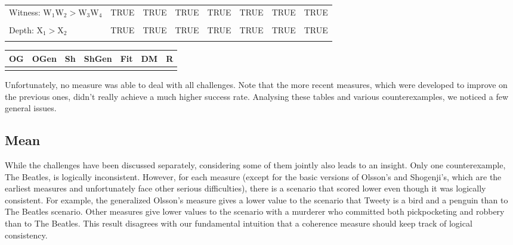 \documentclass[10pt,]{scrartcl}
\begin{document}
\begin{table}[H]
{\begin{tabular}{llllllll}
Witness: W$_1$W$_2>$W$_3$W$_4$ & TRUE & TRUE & TRUE & TRUE & TRUE & TRUE & TRUE\\
\cellcolor{gray!6}{Witness: W$_4$W$_5>$W$_3$W$_4$} & \cellcolor{gray!6}{TRUE} & \cellcolor{gray!6}{TRUE} & \cellcolor{gray!6}{TRUE} & \cellcolor{gray!6}{TRUE} & \cellcolor{gray!6}{TRUE} & \cellcolor{gray!6}{TRUE} & \cellcolor{gray!6}{TRUE}\\
Depth: X$_1>$X$_2$ & TRUE & TRUE & TRUE & TRUE & TRUE & TRUE & TRUE\\
\cellcolor{gray!6}{Dodecahedron:  Regular $=$  Dodecahedron} & \cellcolor{gray!6}{TRUE} & \cellcolor{gray!6}{TRUE} & \cellcolor{gray!6}{FALSE} & \cellcolor{gray!6}{FALSE} & \cellcolor{gray!6}{FALSE} & \cellcolor{gray!6}{FALSE} & \cellcolor{gray!6}{FALSE}\\
\bottomrule
\end{tabular}}
\end{table}

\begin{table}[H]
\centering
\begin{tabular}{rrrrrrr}
\toprule
OG & OGen & Sh & ShGen & Fit & DM & R\\
\midrule
\cellcolor{gray!6}{0.733} & \cellcolor{gray!6}{0.733} & \cellcolor{gray!6}{0.706} & \cellcolor{gray!6}{0.647} & \cellcolor{gray!6}{0.706} & \cellcolor{gray!6}{0.647} & \cellcolor{gray!6}{0.706}\\
\bottomrule
\end{tabular}
\end{table}

Unfortunately, no measure was able to deal with all challenges. Note
that the more recent measures, which were developed to improve on the
previous ones, didn't really achieve a much higher success rate.
Analysing these tables and various counterexamples, we noticed a few
general issues.

\subsection{Mean}\label{sec:mean}

While the challenges have been discussed separately, considering some of
them jointly also leads to an insight. Only one counterexample,
\textsf{The Beatles}, is logically inconsistent. However, for each
measure (except for the basic versions of Olsson's and Shogenji's, which
are the earliest measures and unfortunately face other serious
difficulties), there is a scenario that scored lower even though it was
logically consistent. For example, the generalized Olsson's measure
gives a lower value to the scenario that
\textsf{Tweety is a bird and a penguin} than to
\textsf{The Beatles scenario}. Other measures give lower values to the
scenario with a
\textsf{murderer who committed both pickpocketing and robbery} than to
\textsf{The Beatles}. This result disagrees with our fundamental
intuition that a coherence measure should keep track of logical
consistency.
\end{document}
